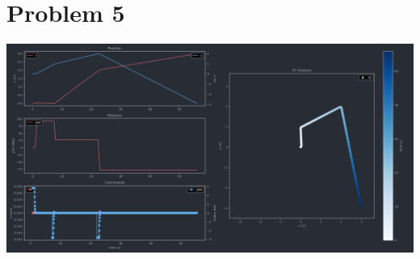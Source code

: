 \documentclass{article}
\begin{document}
    \section*{Problem 5}
        \raggedright
        \includegraphics[width=\linewidth]{Problem 5 Telemetry.png}
\end{document}
